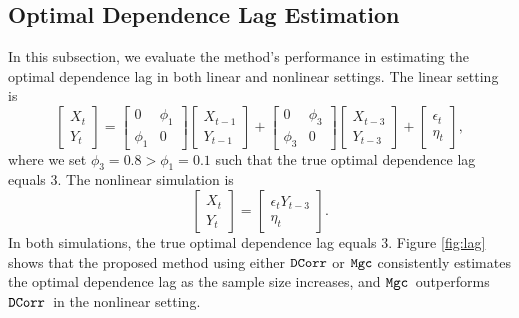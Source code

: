 \subsection{Optimal Dependence Lag Estimation}
\label{sim2}
In this subsection, we evaluate the method's performance in estimating the optimal dependence lag in both linear and nonlinear settings. The linear setting is
\begin{equation*}
    \begin{bmatrix}
    X_t\\
    Y_t
    \end{bmatrix}
    =
    \begin{bmatrix}
    0 & \phi_1\\
    \phi_1 & 0
    \end{bmatrix}
    \begin{bmatrix}
    X_{t-1}\\
    Y_{t-1}
    \end{bmatrix}
    +
    \begin{bmatrix}
    0 & \phi_3\\
    \phi_3 & 0
    \end{bmatrix}
    \begin{bmatrix}
    X_{t-3}\\
    Y_{t-3}
    \end{bmatrix}
    +
    \begin{bmatrix}
    \epsilon_t\\
    \eta_t
    \end{bmatrix},
\end{equation*}
where we set $\phi_3=0.8  > \phi_1=0.1$ such that the true optimal dependence lag equals $3$.
The nonlinear simulation is
\begin{equation*}
    \begin{bmatrix}
    X_t\\
    Y_t
    \end{bmatrix}
    =
    \begin{bmatrix}
    \epsilon_t Y_{t-3}\\
    \eta_t
    \end{bmatrix}.
\end{equation*}
% 
In both simulations, the true optimal dependence lag equals $3$. Figure \ref{fig:lag} shows that the proposed method using either $\operatorname{\mathtt{DCorr}}${} or $\mathtt{Mgc}${} consistently estimates the optimal dependence lag as the sample size increases, and $\mathtt{Mgc}$~outperforms $\operatorname{\mathtt{DCorr}}$~in the nonlinear setting. 


